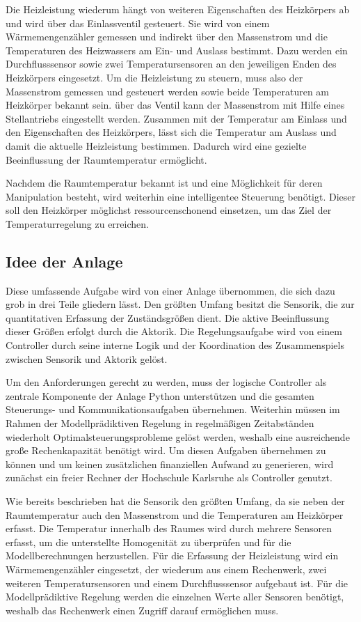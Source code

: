 Die Heizleistung wiederum hängt von weiteren Eigenschaften des Heizkörpers ab und wird über das Einlassventil gesteuert. Sie wird von einem Wärmemengenzähler gemessen und indirekt über den Massenstrom und die Temperaturen des Heizwassers am Ein- und Auslass bestimmt. Dazu werden ein Durchflusssensor sowie zwei Temperatursensoren an den jeweiligen Enden des Heizkörpers eingesetzt. Um die Heizleistung zu steuern, muss also der Massenstrom gemessen und gesteuert werden sowie beide Temperaturen am Heizkörper bekannt sein. über das Ventil kann der Massenstrom mit Hilfe eines Stellantriebs eingestellt werden. Zusammen mit der Temperatur am Einlass und den Eigenschaften des Heizkörpers, lässt sich die Temperatur am Auslass und damit die aktuelle Heizleistung bestimmen. Dadurch wird eine gezielte Beeinflussung der Raumtemperatur ermöglicht.

Nachdem die Raumtemperatur bekannt ist und eine Möglichkeit für deren Manipulation besteht, wird weiterhin eine intelligentee Steuerung benötigt. Dieser soll den Heizkörper möglichst ressourcenschonend einsetzen, um das Ziel der Temperaturregelung zu erreichen.

\subsection{Idee der Anlage}

Diese umfassende Aufgabe wird von einer Anlage übernommen, die sich dazu grob in drei Teile gliedern lässt. Den größten Umfang besitzt die Sensorik, die zur quantitativen Erfassung der Zuständsgrößen dient. Die aktive Beeinflussung dieser Größen erfolgt durch die Aktorik. Die Regelungsaufgabe wird von einem Controller durch seine interne Logik und der Koordination des Zusammenspiels zwischen Sensorik und Aktorik gelöst.

Um den Anforderungen gerecht zu werden, muss der logische Controller als zentrale Komponente der Anlage Python unterstützen und die gesamten Steuerungs- und Kommunikationsaufgaben übernehmen. Weiterhin müssen im Rahmen der Modellprädiktiven Regelung in regelmäßigen Zeitabständen wiederholt Optimalsteuerungsprobleme gelöst werden, weshalb eine ausreichende große Rechenkapazität benötigt wird. Um diesen Aufgaben übernehmen zu können und um keinen zusätzlichen finanziellen Aufwand zu generieren, wird zunächst ein freier Rechner der Hochschule Karlsruhe als Controller genutzt.  

Wie bereits beschrieben hat die Sensorik den größten Umfang, da sie neben der Raumtemperatur auch den Massenstrom und die Temperaturen am Heizkörper erfasst. Die Temperatur innerhalb des Raumes wird durch mehrere Sensoren erfasst, um die unterstellte Homogenität zu überprüfen und für die Modellberechnungen herzustellen. Für die Erfassung der Heizleistung wird ein Wärmemengenzähler eingesetzt, der wiederum aus einem Rechenwerk, zwei weiteren Temperatursensoren und einem Durchflusssensor aufgebaut ist. Für die Modellprädiktive Regelung werden die einzelnen Werte aller Sensoren benötigt, weshalb das Rechenwerk einen Zugriff darauf ermöglichen muss.

